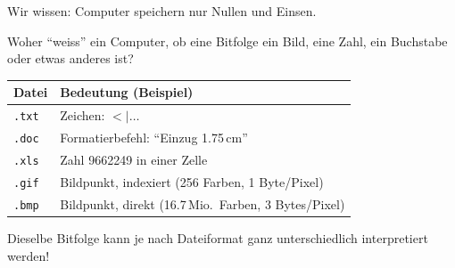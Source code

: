 \renewcommand{\thelektion}{L07 \textperiodcentered{} Dateiformate \& Speicherplatz}

\begin{frame}\end{frame}

\begin{frame}
\begin{center}
Wir wissen: Computer speichern nur Nullen und Einsen.
\vspace{4mm}

Woher \enquote{weiss} ein Computer, ob eine Bitfolge ein Bild, eine Zahl, ein Buchstabe oder etwas anderes ist?
\end{center}
\end{frame}

\begin{frame}
\begin{table}[H]
	\centering
	\small
	\begin{tabular}{l|p{6.3cm}}
		\textbf{Datei} & \textbf{Bedeutung (Beispiel)} \\\midrule
		\texttt{.txt} & Zeichen: $<|\ldots$ \\
		\texttt{.doc} & Formatierbefehl: \enquote{Einzug 1.75\,cm} \\
		\texttt{.xls} & Zahl 9662249 in einer Zelle \\
		\texttt{.gif} & Bildpunkt, indexiert (256 Farben, 1 Byte/Pixel) \\
		\texttt{.bmp} & Bildpunkt, direkt (16.7\,Mio.\ Farben, 3 Bytes/Pixel) \\
	\end{tabular}
\end{table}
\begin{center}Dieselbe Bitfolge kann je nach Dateiformat ganz unterschiedlich interpretiert werden!\end{center}
\end{frame}


